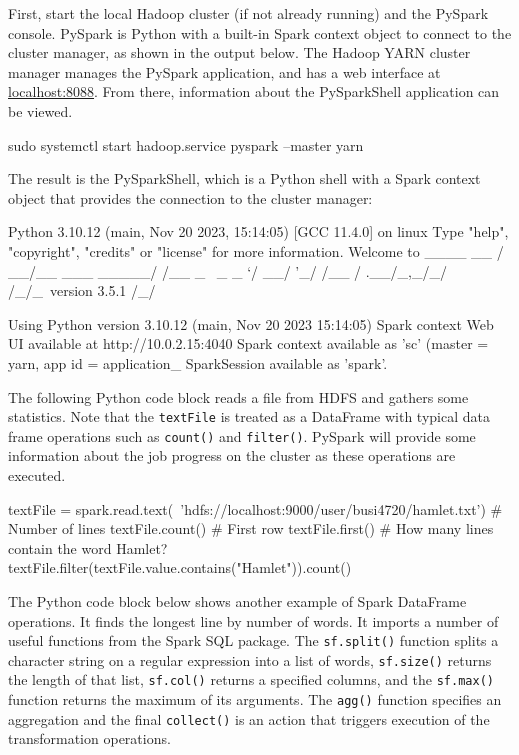 First, start the local Hadoop cluster (if not already running) and the PySpark console. PySpark is Python with a built-in Spark context object to connect to the cluster manager, as shown in the output below. The Hadoop YARN cluster manager manages the PySpark application, and has a web interface at \url{localhost:8088}. From there, information about the PySparkShell application can be viewed.

\begin{bashcode}
sudo systemctl start hadoop.service
pyspark --master yarn
\end{bashcode}

The result is the PySparkShell, which is a Python shell with a Spark context object that provides the connection to the cluster manager:

\begin{textcode}
Python 3.10.12 (main, Nov 20 2023, 15:14:05) [GCC 11.4.0] on linux
Type "help", "copyright", "credits" or "license" for more information.
Welcome to
      ____              __
     / __/__  ___ _____/ /__
    _\ \/ _ \/ _ `/ __/  '_/
   /__ / .__/\_,_/_/ /_/\_\   version 3.5.1
      /_/

Using Python version 3.10.12 (main, Nov 20 2023 15:14:05)
Spark context Web UI available at http://10.0.2.15:4040
Spark context available as 'sc' (master = yarn, app id = application_
SparkSession available as 'spark'.
\end{textcode}

The following Python code block reads a file from HDFS and gathers some statistics. Note that the \texttt{textFile} is treated as a DataFrame with typical data frame operations such as \texttt{count()} and \texttt{filter()}. PySpark will provide some information about the job progress on the cluster as these operations are executed.

\begin{pythoncode}
textFile = spark.read.text(\
    'hdfs://localhost:9000/user/busi4720/hamlet.txt')
# Number of lines
textFile.count() 
# First row
textFile.first()
# How many lines contain the word Hamlet?
textFile.filter(textFile.value.contains("Hamlet")).count() 
\end{pythoncode}

The Python code block below shows another example of Spark DataFrame operations. It finds the longest line by number of words. It imports a number of useful functions from the Spark SQL package. The \texttt{sf.split()} function splits a character string on a regular expression into a list of words, \texttt{sf.size()} returns the length of that list, \texttt{sf.col()} returns a specified columns, and the \texttt{sf.max()} function returns the maximum of its arguments. The \texttt{agg()} function specifies an aggregation and the final \texttt{collect()} is an action that triggers execution of the transformation operations.

